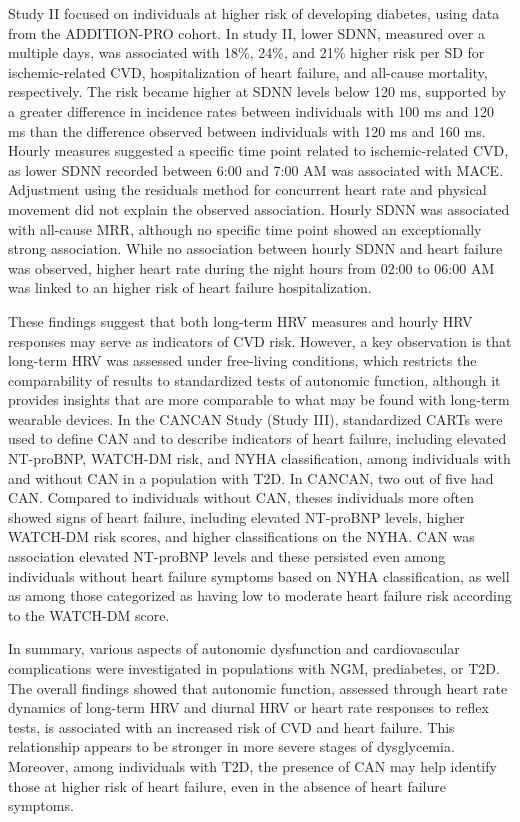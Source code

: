 \documentclass[
  letterpaper,
  headsepline=true,
  open=any]{scrbook}
\begin{document}
Study II focused on individuals at higher risk of developing diabetes,
using data from the ADDITION-PRO cohort. In study II, lower SDNN,
measured over a multiple days, was associated with 18\%, 24\%, and 21\%
higher risk per SD for ischemic-related CVD, hospitalization of heart
failure, and all-cause mortality, respectively. The risk became higher
at SDNN levels below 120 ms, supported by a greater difference in
incidence rates between individuals with 100 ms and 120 ms than the
difference observed between individuals with 120 ms and 160 ms. Hourly
measures suggested a specific time point related to ischemic-related
CVD, as lower SDNN recorded between 6:00 and 7:00 AM was associated with
MACE. Adjustment using the residuals method for concurrent heart rate
and physical movement did not explain the observed association. Hourly
SDNN was associated with all-cause MRR, although no specific time point
showed an exceptionally strong association. While no association between
hourly SDNN and heart failure was observed, higher heart rate during the
night hours from 02:00 to 06:00 AM was linked to an higher risk of heart
failure hospitalization.

These findings suggest that both long-term HRV measures and hourly HRV
responses may serve as indicators of CVD risk. However, a key
observation is that long-term HRV was assessed under free-living
conditions, which restricts the comparability of results to standardized
tests of autonomic function, although it provides insights that are more
comparable to what may be found with long-term wearable devices. In the
CANCAN Study (Study III), standardized CARTs were used to define CAN and
to describe indicators of heart failure, including elevated NT-proBNP,
WATCH-DM risk, and NYHA classification, among individuals with and
without CAN in a population with T2D. In CANCAN, two out of five had
CAN. Compared to individuals without CAN, theses individuals more often
showed signs of heart failure, including elevated NT-proBNP levels,
higher WATCH-DM risk scores, and higher classifications on the NYHA. CAN
was association elevated NT-proBNP levels and these persisted even among
individuals without heart failure symptoms based on NYHA classification,
as well as among those categorized as having low to moderate heart
failure risk according to the WATCH-DM score.

In summary, various aspects of autonomic dysfunction and cardiovascular
complications were investigated in populations with NGM, prediabetes, or
T2D. The overall findings showed that autonomic function, assessed
through heart rate dynamics of long-term HRV and diurnal HRV or heart
rate responses to reflex tests, is associated with an increased risk of
CVD and heart failure. This relationship appears to be stronger in more
severe stages of dysglycemia. Moreover, among individuals with T2D, the
presence of CAN may help identify those at higher risk of heart failure,
even in the absence of heart failure symptoms.
\end{document}
